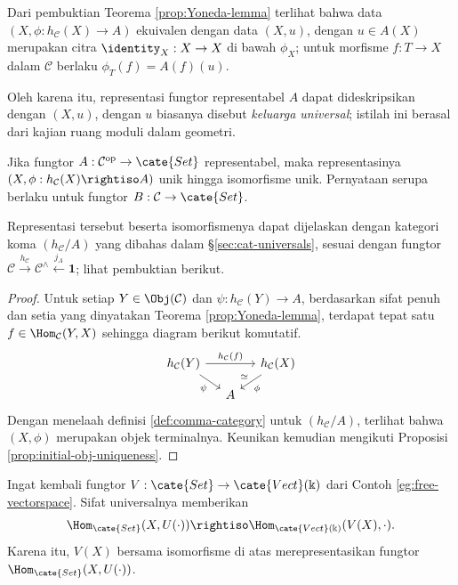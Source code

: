 \begin{remark}\label{rem:Yoneda-universal-family}
	Dari pembuktian Teorema \ref{prop:Yoneda-lemma} terlihat bahwa data $(X, \phi: h_{\mathcal{C}}(X) \to A)$ ekuivalen dengan data $(X, u)$, dengan $u \in A(X)$ merupakan citra $\identity_X: X \to X$ di bawah $\phi_X$; untuk morfisme $f: T \to X$ dalam $\mathcal{C}$ berlaku $\phi_T(f) = A(f)(u)$.
	
	Oleh karena itu, representasi fungtor representabel $A$ dapat dideskripsikan dengan $(X, u)$, dengan $u$ biasanya disebut \emph{keluarga universal}; istilah ini berasal dari kajian ruang moduli dalam geometri.
\end{remark}

\begin{lemma}\label{prop:representable-functor-uniqueness}
	Jika fungtor $A: \mathcal{C}^\text{op} \to \cate{Set}$ representabel, maka representasinya $(X, \phi: h_{\mathcal{C}}(X) \rightiso A)$ unik hingga isomorfisme unik. Pernyataan serupa berlaku untuk fungtor $B: \mathcal{C} \to \cate{Set}$.
\end{lemma}

	Representasi tersebut beserta isomorfismenya dapat dijelaskan dengan kategori koma $(h_{\mathcal{C}} / A)$ yang dibahas dalam \S\ref{sec:cat-universals}, sesuai dengan fungtor $\mathcal{C} \xrightarrow{h_{\mathcal{C}}} \mathcal{C}^\wedge \xleftarrow{j_A} \mathbf{1}$; lihat pembuktian berikut.
\begin{proof}
	Untuk setiap $Y \in \Obj(\mathcal{C})$ dan $\psi: h_{\mathcal{C}}(Y) \to A$, berdasarkan sifat penuh dan setia yang dinyatakan Teorema \ref{prop:Yoneda-lemma}, terdapat tepat satu $f \in \Hom_{\mathcal{C}}(Y, X)$ sehingga diagram berikut komutatif.
	\[\begin{tikzcd}[column sep=small, row sep=small]
		h_{\mathcal{C}}(Y) \arrow[rd, "\psi"'] \arrow[rr, "h_{\mathcal{C}}(f)"] & & h_{\mathcal{C}}(X) \arrow[ld, "\phi", "\simeq"'] \\
		 & A &
	\end{tikzcd}\]
	Dengan menelaah definisi \ref{def:comma-category} untuk $(h_{\mathcal{C}} / A)$, terlihat bahwa $(X, \phi)$ merupakan objek terminalnya. Keunikan kemudian mengikuti Proposisi \ref{prop:initial-obj-uniqueness}.
\end{proof}

\begin{example}
	Ingat kembali fungtor $V: \cate{Set} \to \cate{Vect}(\Bbbk)$ dari Contoh \ref{eg:free-vectorspace}. Sifat universalnya memberikan
	\[ \Hom_{\cate{Set}}(X, U(\cdot)) \rightiso \Hom_{\cate{Vect}(\Bbbk)}(V(X), \cdot). \]
	Karena itu, $V(X)$ bersama isomorfisme di atas merepresentasikan fungtor $\Hom_{\cate{Set}}(X, U(\cdot))$.
\end{example}

